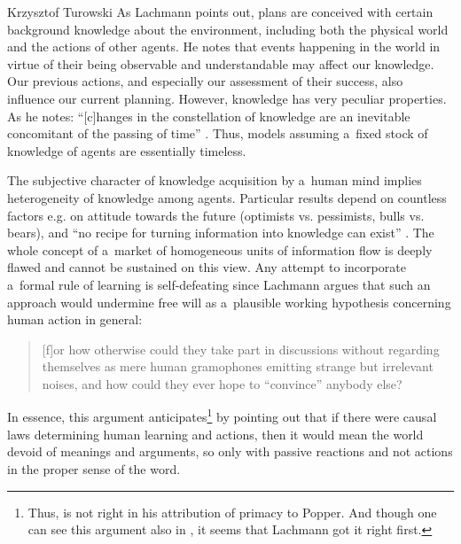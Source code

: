 \begin{artengenv}{Krzysztof Turowski}
As Lachmann points out, plans are conceived with certain background knowledge about the environment, including both the physical world and the actions of other agents.
He notes that events happening in the world in virtue of their being observable and understandable may affect our knowledge.
Our previous actions, and especially our assessment of their success, also influence our current planning.
However, knowledge has very peculiar properties. As he notes: ``[c]hanges in the constellation of knowledge are an inevitable concomitant of the passing of time'' \parencite[200]{lachmann-hayek}.
Thus, models assuming a~fixed stock of knowledge of agents are essentially timeless.

The subjective character of knowledge acquisition by a~human mind implies heterogeneity of knowledge among agents.
Particular results depend on countless factors e.g. on attitude towards the future (optimists vs. pessimists, bulls vs. bears), and ``no recipe for turning information into knowledge can exist'' \parencite[51]{lachmann1986market}.
The whole concept of a~market of homogeneous units of information flow is deeply flawed and cannot be sustained on this view.
Any attempt to incorporate a~formal rule of learning is self-defeating since Lachmann argues that such an approach would undermine free will as a~plausible working hypothesis concerning human action in general:
\begin{quote}
[f]or how otherwise could they take part in discussions without regarding themselves as mere human gramophones emitting strange but irrelevant noises, and how could they ever hope to ``convince'' anybody else? \parencite[167]{lachmann-science}
\end{quote}
In essence, this argument anticipates\footnote{Thus, \textcite[38]{hoppe} is not right in his attribution of primacy to Popper. And though one can see this argument also in \textcite[104]{shackle-time}, it seems that Lachmann got it right first.} \textcite[10]{popper-poverty} by pointing out that if there were causal laws determining human learning and actions, then it would mean the world devoid of meanings and arguments, so only with passive reactions and not actions in the proper sense of the word.


\end{artengenv}
